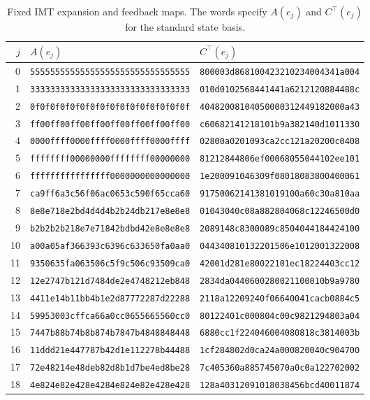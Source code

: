 \begin{table}[t]
\centering
\caption{Fixed IMT expansion and feedback maps. The words specify
$A(e_j)$ and $C^\top(e_j)$ for the standard state basis.}
\label{tab:imt-maps}
\scriptsize
\setlength{\tabcolsep}{3pt}
\begin{tabular}{@{}rll@{}}
\toprule
$j$ & $A(e_j)$ & $C^\top(e_j)$ \\
\midrule
0 & \texttt{55555555555555555555555555555555} & \texttt{800003d868100423210234004341a004} \\
1 & \texttt{33333333333333333333333333333333} & \texttt{010d0102568441441a6212120884488c} \\
2 & \texttt{0f0f0f0f0f0f0f0f0f0f0f0f0f0f0f0f} & \texttt{40482008104050000312449182000a43} \\
3 & \texttt{ff00ff00ff00ff00ff00ff00ff00ff00} & \texttt{c60682141218101b9a382140d1011330} \\
4 & \texttt{0000ffff0000ffff0000ffff0000ffff} & \texttt{02800a0201093ca2cc121a20200c0408} \\
5 & \texttt{ffffffff00000000ffffffff00000000} & \texttt{81212844806ef00068055044102ee101} \\
6 & \texttt{ffffffffffffffff0000000000000000} & \texttt{1e200091046309f08018083800400061} \\
7 & \texttt{ca9ff6a3c56f06ac0653c590f65cca60} & \texttt{91750062141381019100a60c30a810aa} \\
8 & \texttt{8e8e718e2bd4d4d4b2b24db217e8e8e8} & \texttt{01043040c08a882804068c12246500d0} \\
9 & \texttt{b2b2b2b218e7e71842bdbd42e8e8e8e8} & \texttt{2089148c8300089c8504044184424100} \\
10 & \texttt{a00a05af366393c6396c633650fa0aa0} & \texttt{044340810132201506e1012001322008} \\
11 & \texttt{9350635fa063506c5f9c506c93509ca0} & \texttt{42001d281e80022101ec18224403cc12} \\
12 & \texttt{12e2747b121d7484de2e4748212eb848} & \texttt{2834da0440600280021100010b9a9780} \\
13 & \texttt{4411e14b11bb4b1e2d87772287d22288} & \texttt{2118a12209240f06640041cacb0884c5} \\
14 & \texttt{59953003cffca66a0cc0655665560cc0} & \texttt{80122401c000804c00c9821294803a04} \\
15 & \texttt{7447b88b74b8b874b7847b4848848448} & \texttt{6880cc1f224046004080818c3814003b} \\
16 & \texttt{11ddd21e447787b42d1e112278b44488} & \texttt{1cf284802d0ca24a000820040c904700} \\
17 & \texttt{72e48214e48deb82d8b1d7be4ed8be28} & \texttt{7c405360a885745070a0c0a122702002} \\
18 & \texttt{4e824e82e428e4284e824e82e428e428} & \texttt{128a40312091018038456bcd40011874} \\
\bottomrule
\end{tabular}
\end{table}

